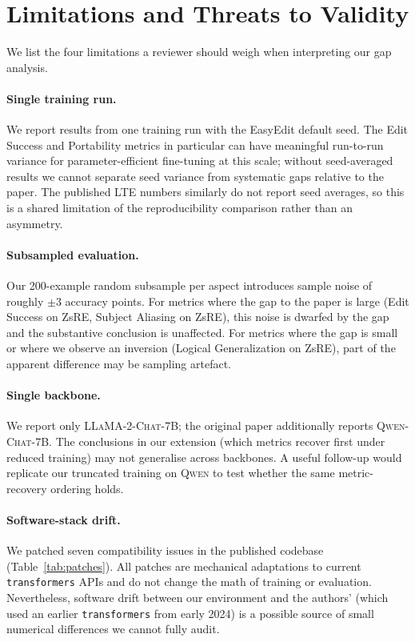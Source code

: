 \documentclass[11pt,a4paper,twocolumn]{article}
\begin{document}
\section{Limitations and Threats to Validity}
\label{sec:limitations}

We list the four limitations a reviewer should weigh when interpreting our gap analysis.

\paragraph{Single training run.} We report results from one training run with the EasyEdit default seed. The Edit Success and Portability metrics in particular can have meaningful run-to-run variance for parameter-efficient fine-tuning at this scale; without seed-averaged results we cannot separate seed variance from systematic gaps relative to the paper. The published LTE numbers similarly do not report seed averages, so this is a shared limitation of the reproducibility comparison rather than an asymmetry.

\paragraph{Subsampled evaluation.} Our 200-example random subsample per aspect introduces sample noise of roughly $\pm 3$ accuracy points. For metrics where the gap to the paper is large (Edit Success on ZsRE, Subject Aliasing on ZsRE), this noise is dwarfed by the gap and the substantive conclusion is unaffected. For metrics where the gap is small or where we observe an inversion (Logical Generalization on ZsRE), part of the apparent difference may be sampling artefact.

\paragraph{Single backbone.} We report only \textsc{LLaMA-2-Chat-7B}; the original paper additionally reports \textsc{Qwen-Chat-7B}. The conclusions in our extension (which metrics recover first under reduced training) may not generalise across backbones. A useful follow-up would replicate our truncated training on \textsc{Qwen} to test whether the same metric-recovery ordering holds.

\paragraph{Software-stack drift.} We patched seven compatibility issues in the published codebase (Table~\ref{tab:patches}). All patches are mechanical adaptations to current \texttt{transformers} APIs and do not change the math of training or evaluation. Nevertheless, software drift between our environment and the authors' (which used an earlier \texttt{transformers} from early 2024) is a possible source of small numerical differences we cannot fully audit.
\end{document}
